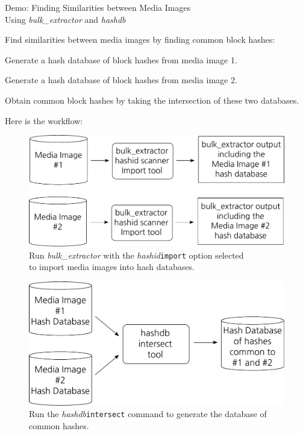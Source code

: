 \documentclass[12pt,twoside]{article}
\newcommand{\hdb}{\emph{hashdb}\xspace}
\newcommand{\bulk}{\emph{bulk\_extractor}\xspace}
\newcommand{\hashid}{\emph{hashid}\xspace}
\begin{document}
\begin{center}
\Large Demo: Finding Similarities between Media Images \\
\large Using \bulk and \hdb
\end{center}

Find similarities between media images by finding common block hashes:
\begin{compactenum}
\item Generate a hash database of block hashes from media image 1.
\item Generate a hash database of block hashes from media image 2.
\item Obtain common block hashes
by taking the intersection of these two databases.
\end{compactenum}
Here is the workflow:
\begin{figure}[H]
  \center
  \includegraphics[scale=0.6]{drawings/import_hashes}
  \caption*{Run \bulk with the \hashid \texttt{import} option selected \\
            to import media images into hash databases.}
\end{figure}

\begin{figure}[H]
  \center
  \includegraphics[scale=0.6]{drawings/intersect_hashes}
  \caption*{Run the \hdb \texttt{intersect} command
            to generate the database of common hashes.}
\end{figure}
\end{document}
